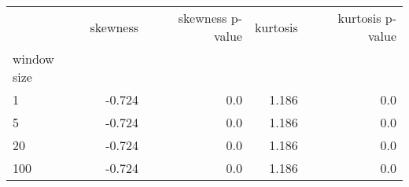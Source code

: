\begin{tabular}{lrrrr}
\toprule
{} &  skewness &  skewness p-value &  kurtosis &  kurtosis p-value \\
window size &           &                   &           &                   \\
\midrule
1           &    -0.724 &               0.0 &     1.186 &               0.0 \\
5           &    -0.724 &               0.0 &     1.186 &               0.0 \\
20          &    -0.724 &               0.0 &     1.186 &               0.0 \\
100         &    -0.724 &               0.0 &     1.186 &               0.0 \\
\bottomrule
\end{tabular}
